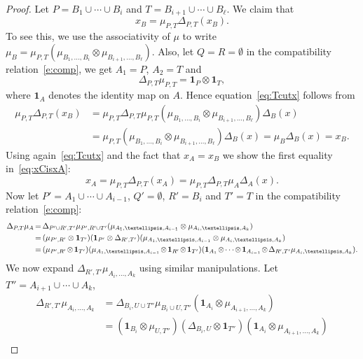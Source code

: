 \documentclass[10pt]{amsart}
\theoremstyle{definition}
\newcommand*{\Mk}{\mkern -2mu}
\def\Id{\mathbf{1}}
\begin{document}
\begin{proof}
Let $P=B_1\cup\cdots\cup B_i$ and $T=B_{i+1}\cup\cdots\cup B_\ell$.
We claim that
\begin{equation}\label{eq:Tcutx}
 x_B=\mu_{P,T}\Delta_{P,T}(x_B).
\end{equation}
To see this, we use the associativity of $\mu$ to write $\mu_B=\mu_{P,T}(\mu_{B_1,\ldots,B_i}\otimes\mu_{B_{i+1},\ldots,B_\ell})$. Also, let $Q=R=\emptyset$ in the compatibility relation~\eqref{e:comp}, we get $A_1=P$, $A_2=T$ and 
 $$\Delta_{P,T}\mu_{P,T}=\Id_P\otimes \Id_T,$$
where $\Id_A$ denotes the identity map on $A$. Hence equation~\eqref{eq:Tcutx} follows from
 $$
 \begin{aligned}
 \mu_{P,T}\Delta_{P,T}(x_B)&=\mu_{P,T}\Delta_{P,T}\mu_{P,T}(\mu_{B_1,\ldots,B_i}\otimes\mu_{B_{i+1},\ldots,B_\ell})\Delta_B(x)\\
 &=\mu_{P,T}(\mu_{B_1,\ldots,B_i}\otimes\mu_{B_{i+1},\ldots,B_\ell})\Delta_B(x)=\mu_B\Delta_B(x)=x_B.
 \end{aligned} 
 $$
Using again~\eqref{eq:Tcutx} and the fact that $x_A=x_B$ we show the first equality in~\eqref{eq:xCisxA}:
\begin{equation}\label{eq:TcutS}
 x_A=\mu_{P,T}\Delta_{P,T}(x_A)=\mu_{P,T}\Delta_{P,T}\mu_A\Delta_A(x).
\end{equation}
 Now let $P'=A_1\cup\cdots\cup A_{i-1}$, $Q'=\emptyset$, $R'=B_i $ and $T'=T$ in the compatibility relation~\eqref{e:comp}:
 $$
 \begin{aligned}
 \Delta_{P,T}\mu_A &\Mk= \Mk\Delta_{P'\cup R',T'}\mu_{P',R'\cup T'}(\mu_{A_1,\ldots,A_{i-1}}\otimes \mu_{A_i,\ldots,A_k})\\
 &\Mk=\Mk(\mu_{P',R'}\otimes \Id_{T'})(\Id_{P'}\otimes\Delta_{R',T'})(\mu_{A_1,\ldots,A_{i-1}}\otimes \mu_{A_i,\ldots,A_k})\\
 &\Mk=\Mk(\mu_{P',R'}\Mk\otimes \Mk\Id_{T'})(\mu_{A_1,\ldots,A_{i-1}}\Mk\otimes\Mk\Id_{R'}\Mk\otimes\Mk\Id_{T'})
 (\Id_{A_{1}} \Mk\otimes\Mk\cdots\Mk\otimes \Mk\Id_{A_{i-1}}\Mk\otimes\Mk\Delta_{R',T'}\mu_{A_i,\ldots,A_k}).\\
 \end{aligned}
 $$
 We now expand $\Delta_{R',T'}\mu_{A_i,\ldots,A_k}$ using similar manipulations. Let $T''=A_{i+1}\cup\cdots\cup A_k$,
 $$
 \begin{aligned}
 \Delta_{R',T'}\mu_{A_i,\ldots,A_k} &= \Delta_{B_i , U\cup T''}\mu_{B_i\cup U,T''}(\Id_{A_i}\otimes \mu_{A_{i+1},\ldots,A_k})\\
 &=(\Id_{B_i}\otimes \mu_{U,T''})(\Delta_{B_i,U}\otimes\Id_{T''})(\Id_{A_i}\otimes \mu_{A_{i+1},\ldots,A_k})\\

\end{aligned}$$
\end{proof}
\end{document}
